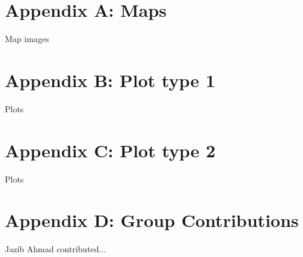 \documentclass{article}
\begin{document}
    
\clearpage


%

\clearpage

\section*{Appendix A: Maps}
    
    Map images
    
\clearpage

\section*{Appendix B: Plot type 1}
    
    Plots
    
\clearpage

\section*{Appendix C: Plot type 2}
    
    Plots

\clearpage

\section*{Appendix D: Group Contributions}
    
    Jazib Ahmad contributed...

\clearpage
\end{document}
